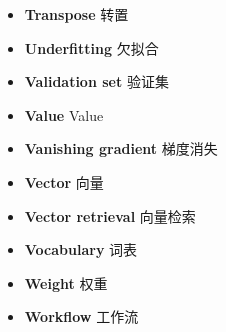 \begin{itemize}[leftmargin=1.2em,itemsep=2pt,topsep=3pt]
\item {\sffamily\bfseries Transpose} \quad 转置\quad {}
\item {\sffamily\bfseries Underfitting} \quad 欠拟合\quad {}
\item {\sffamily\bfseries Validation set} \quad 验证集\quad {}
\item {\sffamily\bfseries Value} \quad Value\quad {}
\item {\sffamily\bfseries Vanishing gradient} \quad 梯度消失\quad {}
\item {\sffamily\bfseries Vector} \quad 向量\quad {}
\item {\sffamily\bfseries Vector retrieval} \quad 向量检索\quad {}
\item {\sffamily\bfseries Vocabulary} \quad 词表\quad {}
\item {\sffamily\bfseries Weight} \quad 权重\quad {}
\item {\sffamily\bfseries Workflow} \quad 工作流\quad {}
\end{itemize}
\normalsize
